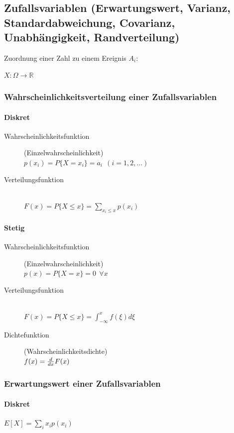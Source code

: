 \subsection{Zufallsvariablen (Erwartungswert, Varianz, Standardabweichung, Covarianz, Unabhängigkeit, Randverteilung)}
Zuordnung einer Zahl zu einem Ereignis $A_i$: 

$X: \Omega \rightarrow \mathbb{R}$

\subsubsection{Wahrscheinlichkeitsverteilung einer Zufallsvariablen}
\paragraph{Diskret}
\begin{description}
    \item[Wahrscheinlichkeitsfunktion] (Einzelwahrscheinlichkeit) \\
    $ p(x_i) = P\{X=x_i\} = a_i ~~ (i=1,2,\dots) $
    \item[Verteilungsfunktion] ~\\
    $ F(x)= P\{X \leqslant x \} = \sum_{x_i \leqslant x} p(x_i) $
\end{description}
\paragraph{Stetig}
\begin{description}
    \item[Wahrscheinlichkeitsfunktion] (Einzelwahrscheinlichkeit) \\
    $ p(x) = P\{ X = x \} = 0 ~~ \forall x $
    \item[Verteilungsfunktion] ~\\
    $ F(x)= P\{X \leqslant x \} = \int_{-\infty}^x f(\xi)d\xi $
    \item[Dichtefunktion] (Wahrscheinlichkeitsdichte)\\
    $ f(x) = {d \over dx} F(x) $
\end{description}

\subsubsection{Erwartungswert einer Zufallsvariablen}
\paragraph{Diskret}
$ E[X] = \sum_{i} x_i p(x_i) $

